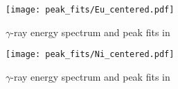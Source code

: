 \begin{figure}[htb]
\texttt{[image: peak\_fits/Eu\_centered.pdf]}
\caption{$\gamma$-ray energy spectrum and peak fits in \texttt{}}
\label{fig:Eu_centered}
\end{figure}

\begin{figure}[htb]
\texttt{[image: peak\_fits/Ni\_centered.pdf]}
\caption{$\gamma$-ray energy spectrum and peak fits in \texttt{}}
\label{fig:Ni_centered}
\end{figure}

